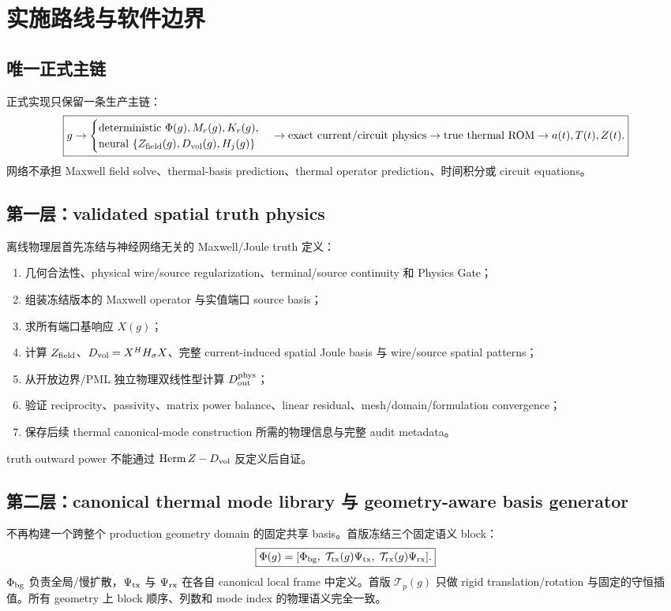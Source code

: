 \section{实施路线与软件边界}

\subsection{唯一正式主链}
正式实现只保留一条生产主链：
\begin{equation}
\boxed{
 g
 \rightarrow
 \begin{cases}
 \text{deterministic }\Phi(g),M_r(g),K_r(g),\\
 \text{neural }\{Z_{\rm field}(g),D_{\rm vol}(g),H_j(g)\}
 \end{cases}
 \rightarrow \text{exact current/circuit physics}
 \rightarrow \text{true thermal ROM}
 \rightarrow a(t),T(t),Z(t).
}
\end{equation}
网络不承担 Maxwell field solve、thermal-basis prediction、thermal operator prediction、时间积分或 circuit equations。

\subsection{第一层：validated spatial truth physics}
离线物理层首先冻结与神经网络无关的 Maxwell/Joule truth 定义：
\begin{enumerate}
  \item 几何合法性、physical wire/source regularization、terminal/source continuity 和 Physics Gate；
  \item 组装冻结版本的 Maxwell operator 与实值端口 source basis；
  \item 求所有端口基响应 $X(g)$；
  \item 计算 $Z_{\rm field}$、$D_{\rm vol}=X^HH_\sigma X$、完整 current-induced spatial Joule basis 与 wire/source spatial patterns；
  \item 从开放边界/PML 独立物理双线性型计算 $D_{\rm out}^{\rm phys}$；
  \item 验证 reciprocity、passivity、matrix power balance、linear residual、mesh/domain/formulation convergence；
  \item 保存后续 thermal canonical-mode construction 所需的物理信息与完整 audit metadata。
\end{enumerate}
truth outward power 不能通过 $\operatorname{Herm}Z-D_{\rm vol}$ 反定义后自证。

\subsection{第二层：canonical thermal mode library 与 geometry-aware basis generator}
不再构建一个跨整个 production geometry domain 的固定共享 basis。首版冻结三个固定语义 block：
\begin{equation}
\boxed{
\Phi(g)=
[\Phi_{\rm bg},\;\mathcal T_{\rm tx}(g)\Psi_{\rm tx},\;\mathcal T_{\rm rx}(g)\Psi_{\rm rx}].
}
\end{equation}
$\Phi_{\rm bg}$ 负责全局/慢扩散，$\Psi_{\rm tx}$ 与 $\Psi_{\rm rx}$ 在各自 canonical local frame 中定义。首版 $\mathcal T_p(g)$ 只做 rigid translation/rotation 与固定的守恒插值。所有 geometry 上 block 顺序、列数和 mode index 的物理语义完全一致。

